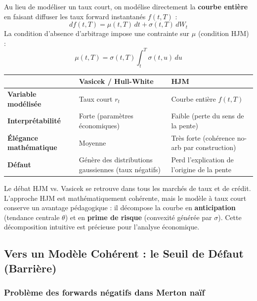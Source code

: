 \begin{definition}
Au lieu de modéliser un taux court, on modélise directement la \textbf{courbe entière} en faisant diffuser les taux forward instantanés $f(t, T)$ :
\[
df(t, T) = \mu(t, T) \, dt + \sigma(t, T) \, dW_t
\]
La condition d'absence d'arbitrage impose une contrainte sur $\mu$ (condition HJM) :
\[
\mu(t, T) = \sigma(t, T) \int_t^T \sigma(t, u) \, du
\]
\end{definition}

\begin{center}
\renewcommand{\arraystretch}{1.3}
\begin{tabular}{|l|p{5cm}|p{5cm}|}
\hline
& \textbf{Vasicek / Hull-White} & \textbf{HJM} \\
\hline
\textbf{Variable modélisée} & Taux court $r_t$ & Courbe entière $f(t,T)$ \\
\hline
\textbf{Interprétabilité} & Forte (paramètres économiques) & Faible (perte du sens de la pente) \\
\hline
\textbf{Élégance mathématique} & Moyenne & Très forte (cohérence no-arb par construction) \\
\hline
\textbf{Défaut} & Génère des distributions gaussiennes (taux négatifs) & Perd l'explication de l'origine de la pente \\
\hline
\end{tabular}
\end{center}

\begin{remarque}
Le débat HJM vs. Vasicek se retrouve dans tous les marchés de taux et de crédit. L'approche HJM est mathématiquement cohérente, mais le modèle à taux court conserve un avantage pédagogique : il décompose la courbe en \textbf{anticipation} (tendance centrale $\theta$) et en \textbf{prime de risque} (convexité générée par $\sigma$). Cette décomposition intuitive est précieuse pour l'analyse économique.
\end{remarque}

\subsection{Vers un Modèle Cohérent : le Seuil de Défaut (Barrière)}

\subsubsection{Problème des forwards négatifs dans Merton naïf}

